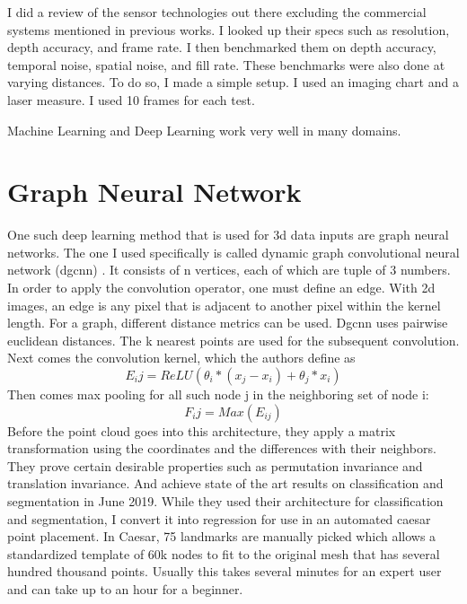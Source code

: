 I did a review of the sensor technologies out there excluding the commercial systems mentioned in previous works. I looked up their specs such as resolution, depth accuracy, and frame rate. I then benchmarked them on depth accuracy, temporal noise, spatial noise, and fill rate. These benchmarks were also done at varying distances. To do so, I made a simple setup. I used an imaging chart and a laser measure. I used 10 frames for each test. 

Machine Learning and Deep Learning work very well in many domains. 

\section{Graph Neural Network}
One such deep learning method that is used for 3d data inputs are graph neural networks. The one I used specifically is called dynamic graph convolutional neural network (dgcnn) \cite{DBLP:journals/corr/abs-1801-07829}. It consists of n vertices, each of which are tuple of 3 numbers. In order to apply the convolution operator, one must define an edge. With 2d images, an edge is any pixel that is adjacent to another pixel within the kernel length. For a graph, different distance metrics can be used. Dgcnn uses pairwise euclidean distances. The k nearest points are used for the subsequent convolution. Next comes the convolution kernel, which the authors define as
\begin{equation}
	E_ij = ReLU(\theta_i * (x_j - x_i) + \theta_j * x_i)
\end{equation}
Then comes max pooling for all such node j in the neighboring set of node i:
\begin{equation}
F_ij = Max(E_{ij})
\end{equation}
Before the point cloud goes into this architecture, they apply a matrix transformation using the coordinates and the differences with their neighbors.
They prove certain desirable properties such as permutation invariance and translation invariance. And achieve state of the art results on classification and segmentation in June 2019.
While they used their architecture for classification and segmentation, I convert it into regression for use in an automated caesar point placement. In Caesar, 75 landmarks are manually picked which allows a standardized template of 60k nodes to fit to the original mesh that has several hundred thousand points. Usually this takes several minutes for an expert user and can take up to an hour for a beginner.
